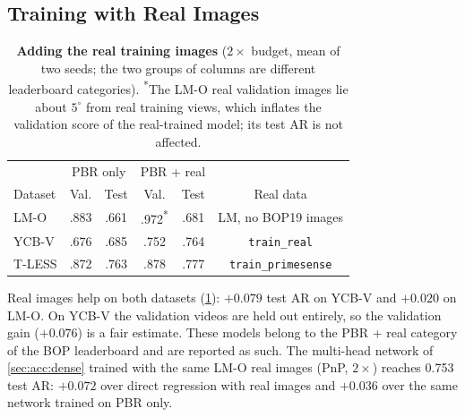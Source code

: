 \subsection{Training with Real Images}
\label{sec:acc:real}
\begin{table}[t]
  \centering
  \small
  \begin{tabular}{@{}lccccc@{}}
    \toprule
    & \multicolumn{2}{c}{PBR only} & \multicolumn{2}{c}{PBR + real} & \\
    Dataset & Val. & Test & Val. & Test & Real data \\
    \midrule
    LM-O  & .883 & .661 & .972\textsuperscript{*} & .681 & LM, no BOP19 images \\
    YCB-V & .676 & .685 & .752 & .764 & \texttt{train\_real} \\
    T-LESS & .872 & .763 & .878 & .777 & \texttt{train\_primesense} \\
    \bottomrule
  \end{tabular}
  \caption{\textbf{Adding the real training images} ($2\times$ budget, mean of two seeds; the two
  groups of columns are different leaderboard categories). \textsuperscript{*}The LM-O real
  validation images lie about $5^\circ$ from real training views, which inflates the validation
  score of the real-trained model; its test AR is not affected.}
  \label{tab:acc_real}
\end{table}
Real images help on both datasets (\cref{tab:acc_real}): $+0.079$ test AR on YCB-V and $+0.020$ on
LM-O. On YCB-V the validation videos are held out entirely, so the validation gain
($+0.076$) is a fair estimate. These models belong to the PBR + real category of the BOP
leaderboard and are reported as such. The multi-head network of \cref{sec:acc:dense} trained with the
same LM-O real images (PnP, $2\times$) reaches 0.753 test AR: $+0.072$ over direct regression with
real images and $+0.036$ over the same network trained on PBR only.

